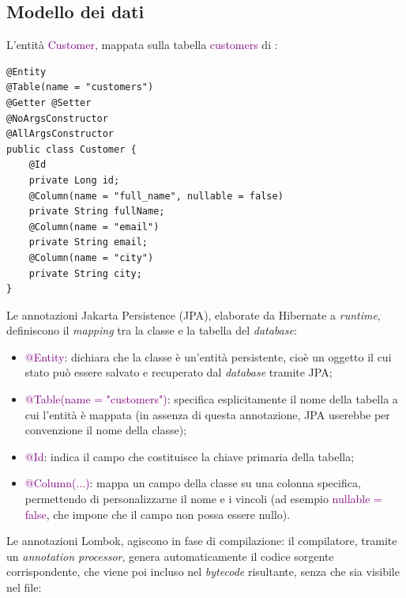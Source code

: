 \subsection{Modello dei dati}
L'entità \textcolor{purple}{Customer}, mappata sulla tabella \textcolor{purple}{customers} di :
\begin{codelisting}[H]
\begin{verbatim}
@Entity
@Table(name = "customers")
@Getter @Setter 
@NoArgsConstructor 
@AllArgsConstructor
public class Customer {
    @Id
    private Long id;
    @Column(name = "full_name", nullable = false)
    private String fullName;
    @Column(name = "email")
    private String email;
    @Column(name = "city")
    private String city;
}
\end{verbatim}
\caption{Customer}
\end{codelisting}
\noindent
Le annotazioni \gls{Jakarta Persistence} (\acrshort{JPA}), elaborate da \gls{Hibernate} a \textit{runtime}, definiscono il \textit{mapping} tra la classe  e la tabella del \textit{database}:
\begin{itemize}
    \item \textcolor{purple}{@Entity}: dichiara che la classe è un'entità persistente, cioè un oggetto il cui stato può essere salvato e recuperato dal \textit{database} tramite \acrshort{JPA};
    \item \textcolor{purple}{@Table(name = "customers")}: specifica esplicitamente il nome della tabella a cui l'entità è mappata (in assenza di questa annotazione, \acrshort{JPA} userebbe per convenzione il nome della classe);
    \item \textcolor{purple}{@Id}: indica il campo che costituisce la chiave primaria della tabella;
    \item \textcolor{purple}{@Column(...)}: mappa un campo della classe su una colonna specifica, permettendo di personalizzarne il nome e i vincoli (ad esempio \textcolor{purple}{nullable = false}, che impone che il campo non possa essere nullo).
\end{itemize}
Le annotazioni \gls{Lombok}, agiscono in fase di compilazione: il compilatore, tramite un \textit{annotation processor}, genera automaticamente il codice sorgente corrispondente, che viene poi incluso nel \textit{bytecode} risultante, senza che sia visibile nel file:
